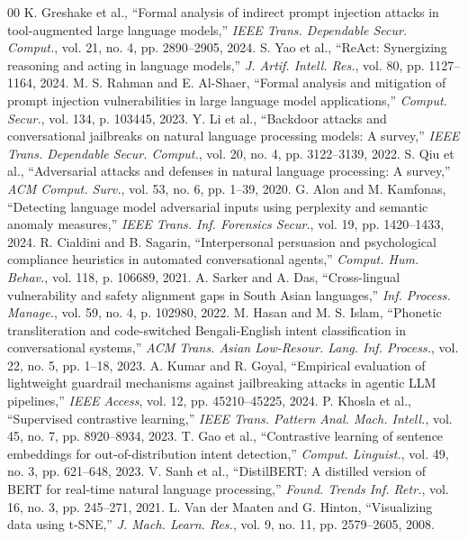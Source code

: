 \documentclass[journal]{IEEEtran}
\begin{document}
\begin{thebibliography}{00}
 K. Greshake et al., ``Formal analysis of indirect prompt injection attacks in tool-augmented large language models,'' \textit{IEEE Trans. Dependable Secur. Comput.}, vol. 21, no. 4, pp. 2890--2905, 2024.
 S. Yao et al., ``ReAct: Synergizing reasoning and acting in language models,'' \textit{J. Artif. Intell. Res.}, vol. 80, pp. 1127--1164, 2024.
 M. S. Rahman and E. Al-Shaer, ``Formal analysis and mitigation of prompt injection vulnerabilities in large language model applications,'' \textit{Comput. Secur.}, vol. 134, p. 103445, 2023.
 Y. Li et al., ``Backdoor attacks and conversational jailbreaks on natural language processing models: A survey,'' \textit{IEEE Trans. Dependable Secur. Comput.}, vol. 20, no. 4, pp. 3122--3139, 2022.
 S. Qiu et al., ``Adversarial attacks and defenses in natural language processing: A survey,'' \textit{ACM Comput. Surv.}, vol. 53, no. 6, pp. 1--39, 2020.
 G. Alon and M. Kamfonas, ``Detecting language model adversarial inputs using perplexity and semantic anomaly measures,'' \textit{IEEE Trans. Inf. Forensics Secur.}, vol. 19, pp. 1420--1433, 2024.
 R. Cialdini and B. Sagarin, ``Interpersonal persuasion and psychological compliance heuristics in automated conversational agents,'' \textit{Comput. Hum. Behav.}, vol. 118, p. 106689, 2021.
 A. Sarker and A. Das, ``Cross-lingual vulnerability and safety alignment gaps in South Asian languages,'' \textit{Inf. Process. Manage.}, vol. 59, no. 4, p. 102980, 2022.
 M. Hasan and M. S. Islam, ``Phonetic transliteration and code-switched Bengali-English intent classification in conversational systems,'' \textit{ACM Trans. Asian Low-Resour. Lang. Inf. Process.}, vol. 22, no. 5, pp. 1--18, 2023.
 A. Kumar and R. Goyal, ``Empirical evaluation of lightweight guardrail mechanisms against jailbreaking attacks in agentic LLM pipelines,'' \textit{IEEE Access}, vol. 12, pp. 45210--45225, 2024.
 P. Khosla et al., ``Supervised contrastive learning,'' \textit{IEEE Trans. Pattern Anal. Mach. Intell.}, vol. 45, no. 7, pp. 8920--8934, 2023.
 T. Gao et al., ``Contrastive learning of sentence embeddings for out-of-distribution intent detection,'' \textit{Comput. Linguist.}, vol. 49, no. 3, pp. 621--648, 2023.
 V. Sanh et al., ``DistilBERT: A distilled version of BERT for real-time natural language processing,'' \textit{Found. Trends Inf. Retr.}, vol. 16, no. 3, pp. 245--271, 2021.
 L. Van der Maaten and G. Hinton, ``Visualizing data using t-SNE,'' \textit{J. Mach. Learn. Res.}, vol. 9, no. 11, pp. 2579--2605, 2008.
\end{thebibliography}
\end{document}
